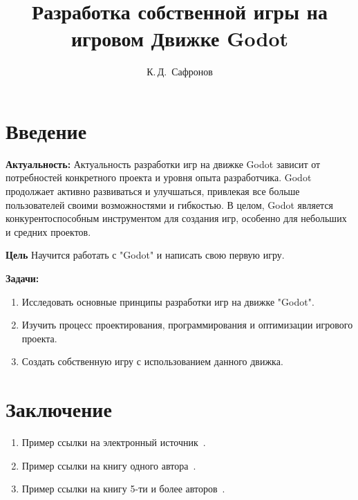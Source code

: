 \documentclass[14pt, oneside]{altsu-report}
\title{Разработка собственной игры на игровом Движке Godot}
\author{К.\,Д.~Сафронов }
\institute{Институт цифровых технологий, электроники и физики}
\date{\the\year}
\begin{document}
\maketitle

\setcounter{page}{2}
\makeabstract
\tableofcontents

\chapter*{Введение}

\textbf{Актуальность:}
Актуальность разработки игр на движке Godot зависит от потребностей конкретного проекта и уровня опыта разработчика. Godot продолжает активно развиваться и улучшаться, привлекая все больше пользователей своими возможностями и гибкостью. В целом, Godot является конкурентоспособным инструментом для создания игр, особенно для небольших и средних проектов.

\textbf{Цель}
Научится работать с "Godot" и написать свою первую игру.

\textbf{Задачи:}
\begin{enumerate}
\item Исследовать основные принципы разработки игр на движке "Godot".
\item Изучить процесс проектирования, программирования и оптимизации игрового проекта.
\item Создать собственную игру с использованием данного движка.
\end{enumerate}





\chapter*{Заключение}

\begin{enumerate}
\item Пример ссылки на электронный источник~\cite{wikiRUBitbucket,wikiRUIdSoftware,wikiRUGitHub}.
\item Пример ссылки на книгу одного автора~\cite{book1author}.
\item Пример ссылки на книгу 5-ти и более авторов~\cite{book5author}.
\end{enumerate}
\end{document}
